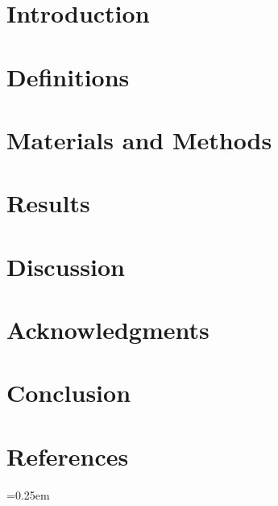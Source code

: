 \documentclass[a4paper, 12pt]{article}
\begin{document}


\newpage
\tableofcontents

\newpage
\section{Introduction}



\newpage
\section{Definitions}



\newpage
\section{Materials and Methods}



\newpage
\section{Results}



\newpage
\section{Discussion}



\newpage
\section{Acknowledgments}



\newpage
\section{Conclusion}



\newpage
\section{References}

\emergencystretch=0.25em
\printbibliography[heading=none]

\newpage
\end{document}
